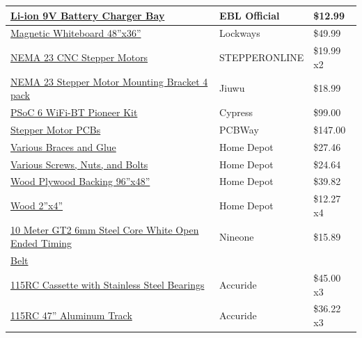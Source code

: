 \begin{table} [H]
\begin{tabular}{|l|l|l|}
		\hline
		\href{https://www.amazon.com/dp/B07GB3TSKH/?coliid=I3FJDEJ8MXP6RY\&colid=22YAOKWOJAKA9\&psc=0\&ref_=lv_ov_lig_dp_it}{Li-ion 9V Battery Charger Bay} 	& EBL Official 		& \$12.99 \\
		\hline
		\href{https://www.amazon.com/gp/product/B06XC9SMVN/ref=ppx_yo_dt_b_asin_title_o01_s00?ie=UTF8\&psc=1}{Magnetic Whiteboard 48''x36''} 	& Lockways 		& \$49.99 \\
		\hline
		\href{https://www.omc-stepperonline.com/nema-23-stepper-motor/nema-23-bipolar-18deg-126nm-1784ozin-28a-25v-57x57x56mm-4-wires-23hs22-2804s.html}{NEMA 23 CNC Stepper Motors} 	& STEPPERONLINE 		& \$19.99 x2 \\
		\hline
		\href{https://www.amazon.com/gp/product/B07JGTHVVL/ref=ppx_yo_dt_b_asin_title_o03_s00?ie=UTF8\&psc=1}{NEMA 23 Stepper Motor Mounting Bracket 4 pack} 	& Jiuwu 		& \$18.99 \\
		\hline
		\href{https://www.cypress.com/documentation/development-kitsboards/psoc-6-wifi-bt-pioneer-kit-cy8ckit-062-wifi-bt}{PSoC 6 WiFi-BT Pioneer Kit} 	& Cypress 		& \$99.00 \\
		\hline
		\href{https://www.pcbway.com/}{Stepper Motor PCBs} 	& PCBWay 		& \$147.00 \\
		\hline
		\href{https://www.homedepot.com/}{Various Braces and Glue} 	& Home Depot 		& \$27.46 \\
		\hline
		\href{https://www.homedepot.com/}{Various Screws, Nuts, and Bolts} 	& Home Depot 		& \$24.64 \\
		\hline
		\href{https://www.homedepot.com/}{Wood Plywood Backing 96''x48''} 	& Home Depot 		& \$39.82 \\
		\hline
		\href{https://www.homedepot.com/}{Wood 2''x4''} 	& Home Depot 		& \$12.27 x4 \\
		\hline
		\href{https://www.amazon.com/gp/product/B0748CNTFR/ref=ppx_yo_dt_b_asin_title_o05_s00?ie=UTF8\&psc=1}{10 Meter GT2 6mm Steel Core White Open Ended Timing} 	& Nineone 		& \$15.89 \\
		\href{https://www.amazon.com/gp/product/B0748CNTFR/ref=ppx_yo_dt_b_asin_title_o05_s00?ie=UTF8\&psc=1}{Belt} 	& 		&  \\
		\hline
		\href{https://www.accuride.com/ss0115-cassrc-carriage-for-115rc}{115RC Cassette with Stainless Steel Bearings} 	& Accuride 		& \$45.00 x3 \\
		\hline
		\href{https://www.accuride.com/al0115-0120rc-aluminum-track-without-pre-drilled-holes}{115RC 47'' Aluminum Track} 	& Accuride 		& \$36.22 x3 \\

\end{tabular}
\end{table}
